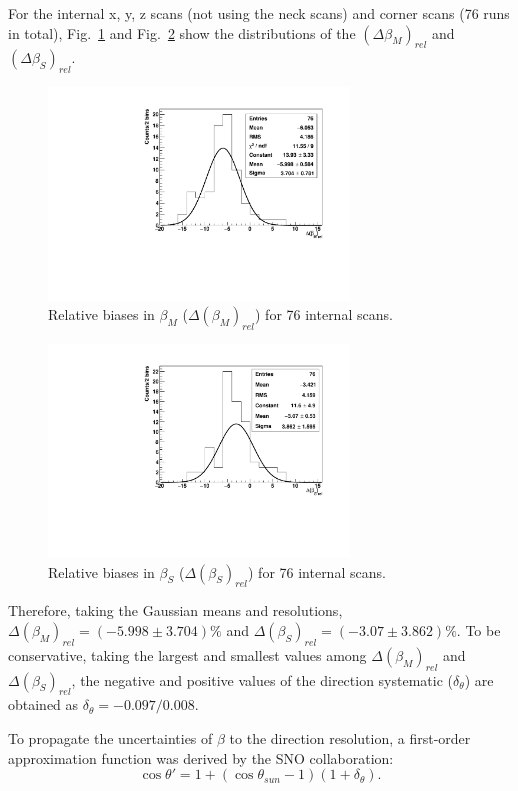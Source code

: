 For the internal x, y, z scans (not using the neck scans) and corner scans (76 runs in total), Fig.~\ref{relative_biases_betaM} and Fig.~\ref{relative_biases_betaS} show the distributions of the $(\Delta \beta_M)_{rel}$ and $(\Delta \beta_S)_{rel}$.
\begin{figure}
	\centering
     \includegraphics[width=8cm]{relativeBias_betaM.pdf}
	\caption{Relative biases in $\beta_M$ ($\Delta(\beta_M)_{rel}$) for 76 internal scans.}
	\label{relative_biases_betaM}
\end{figure}
\begin{figure}
		\centering
	\includegraphics[width=8cm]{relativeBias_betaS.pdf}
\caption{Relative biases in $\beta_S$ ($\Delta(\beta_S)_{rel}$) for 76 internal scans.}
\label{relative_biases_betaS}
\end{figure}
	
Therefore, taking the Gaussian means and resolutions, $\Delta(\beta_M)_{rel}=(-5.998\pm 3.704)\%$ and $\Delta(\beta_S)_{rel}=(-3.07\pm 3.862)\%$. To be conservative, taking the largest and smallest values among $\Delta(\beta_M)_{rel}$ and $\Delta(\beta_S)_{rel}$, the negative and positive values of the direction systematic ($\delta_\theta$) are obtained as $\delta_\theta=-0.097/0.008$.

To propagate the uncertainties of $\beta$ to the direction resolution, a first-order approximation function was derived by the SNO collaboration\cite{drouin2012three}:
\begin{equation}\label{remapTheta}
\cos\theta'=1+(\cos\theta_{sun}-1)(1+\delta_{\theta}).
\end{equation} 


